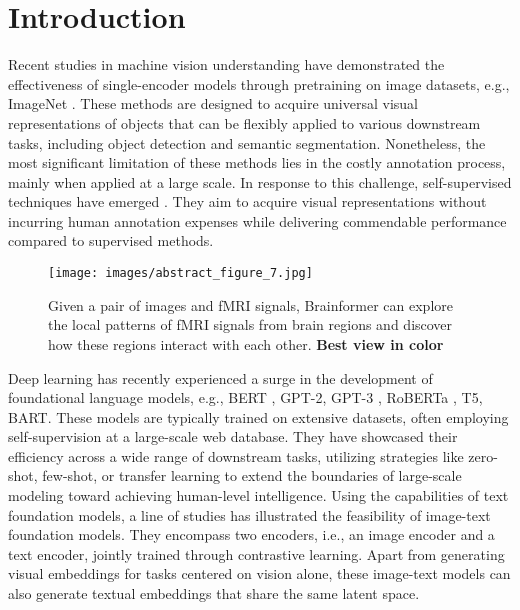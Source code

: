 \section{Introduction}
\label{sec:intro}


Recent studies in machine vision understanding \cite{resnet, densenet, krizhevsky2012imagenet, vaswani2017attention, liu2021swin, dosovitskiy2020image} have demonstrated the effectiveness of single-encoder models through pretraining on image datasets, e.g., ImageNet \cite{imagenet}. These methods are designed to acquire universal visual representations of objects that can be flexibly applied to various downstream tasks, including object detection and semantic segmentation. Nonetheless, the most significant limitation of these methods lies in the costly annotation process, mainly when applied at a large scale. In response to this challenge, self-supervised techniques have emerged \cite{bao2021beit, he2022masked, Nguyen_2023_CVPR}.
They aim to acquire visual representations without incurring human annotation expenses while delivering commendable performance compared to supervised methods. 

\begin{figure}[!t]
    \centering
    \texttt{[image: images/abstract\_figure\_7.jpg]}
    \vspace{-4mm}
    \caption{Given a pair of images and fMRI signals, Brainformer can explore the local patterns of fMRI signals from brain regions and discover how these regions interact with each other. \textbf{Best view in color}}
    \label{fig:enter-label}
    \vspace{-6mm}
    \label{fig:abstract_figure}
\end{figure}

Deep learning has recently experienced a surge in the development of foundational language models, e.g., BERT \cite{BERT}, GPT-2, GPT-3 \cite{brown2020language}, RoBERTa \cite{liu2019roberta}, T5\cite{raffel2020exploring}, BART\cite{lewis2019bart}. These models are typically trained on extensive datasets, often employing self-supervision at a large-scale web database. They have showcased their efficiency across a wide range of downstream tasks, utilizing strategies like zero-shot, few-shot, or transfer learning to extend the boundaries of large-scale modeling toward achieving human-level intelligence. Using the capabilities of text foundation models, a line of studies \cite{yuan2021florence, clip, jia2021scaling} has illustrated the feasibility of image-text foundation models. 
They encompass two encoders, i.e., an image encoder and a text encoder, jointly trained through contrastive learning. Apart from generating visual embeddings for tasks centered on vision alone, these image-text models can also generate textual embeddings that share the same latent space.


